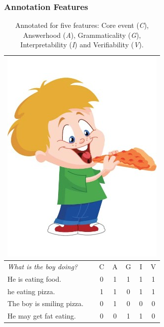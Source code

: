 \documentclass[handout,xcolor={dvipsnames}]{beamer}
\begin{document}
\begin{frame}
\frametitle{Annotation Features}
\begin{table}[htb!]
\small
\begin{center}
\begin{tabular}{|l|c|c|c|c|c|}
\hline
\multicolumn{6}{|c|}{\includegraphics[width=0.25\columnwidth]{figures/I02.jpg}} \\
\hline
\textit{What is the boy doing?} & C & A & G & I & V \\
\hline
\hline
He is eating food. & 0 & 1 & 1 & 1 & 1 \\
\hline
he eating pizza. & 1 & 1 & 0 & 1 & 1 \\
\hline
The boy is smiling pizza. & 0 & 1 & 0 & 0 & 0 \\
\hline
He may get fat eating. & 0 & 0 & 1 & 1 & 0 \\
\hline
\end{tabular}
\caption{\label{tab:dev-transitive} \small Annotated for five features: Core event (\textit{C}), Answerhood (\textit{A}), Grammaticality (\textit{G}), Interpretability (\textit{I}) and Verifiability (\textit{V}).}
\end{center}
\end{table}
\end{frame}
\end{document}
